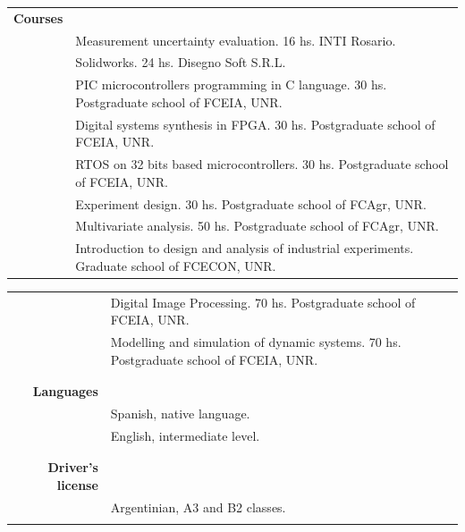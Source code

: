 \documentclass[a4paper,10pt, sans]{article}
\begin{document}
\begin{table}[H]
\begin{tabularx}{\textwidth}{r X}
    
    \textbf{Courses} & {}\\ [1ex]
    {} & Measurement uncertainty evaluation. 16 hs. INTI Rosario. \\  [1ex]
    {} & Solidworks. 24 hs. Disegno Soft S.R.L. \\  [1ex]
    {} & PIC microcontrollers programming in C language. 30 hs. Postgraduate school of FCEIA, UNR. \\  [1ex]
    {} & Digital systems synthesis in FPGA. 30 hs. Postgraduate school of FCEIA, UNR. \\  [1ex]
    {} & RTOS on 32 bits based microcontrollers. 30 hs. Postgraduate school of FCEIA, UNR. \\  [1ex]
    {} & Experiment design. 30 hs. Postgraduate school of FCAgr, UNR. \\  [1ex]
    {} & Multivariate analysis. 50 hs. Postgraduate school of FCAgr, UNR. \\  [1ex]
    {} & Introduction to design and analysis of industrial experiments. Graduate school of FCECON, UNR. \\  [1ex]
    
    
  \end{tabularx}
  \end{table}



  
  \begin{table}[H]
  \centering
  \begin{tabularx}{\textwidth}{r X}  
    {} & Digital Image Processing. 70 hs. Postgraduate school of FCEIA, UNR. \\  [1ex]
    {} & Modelling and simulation of dynamic systems. 70 hs. Postgraduate school of FCEIA, UNR. \\ \\   
    \hline \\  
    \textbf{Languages} & {} \\ [1ex]
    {} & Spanish, native language. \\ [1ex]
    {} & English, intermediate level. \\ \\ \hline \\
      
    \textbf{Driver's license} & {} \\ [1ex]
    {} & Argentinian, A3 and B2 classes.\\
    
  \vspace{5cm}
  \end{tabularx}
  \end{table}
  
\end{document}
